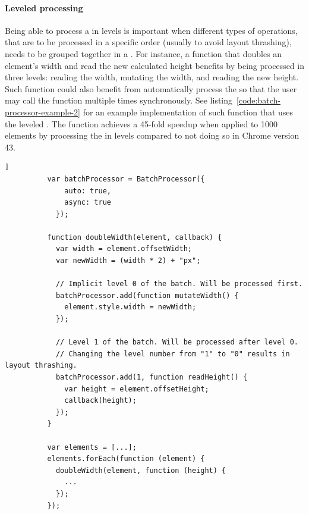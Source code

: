 \documentclass[a4paper,11pt]{kth-mag}
\begin{document}
        \paragraph{Leveled processing}
        Being able to process a  in levels is important when different types of operations, that are to be processed in a specific order (usually to avoid \gls{layout thrashing}), needs to be grouped together in a .
        For instance, a function that doubles an \gls{element}'s width and read the new calculated height benefits by being  processed in three levels: reading the width, mutating the width, and reading the new height.
        Such function could also benefit from automatically process the  so that the user may call the function multiple times synchronously.
        See listing~\ref{code:batch-processor-example-2} for an example implementation of such function that uses the leveled .
        The function achieves a 45-fold speedup when applied to 1000 \glspl{element} by processing the  in levels compared to not doing so in Chrome version 43.
        \begin{lstlisting}[gobble=10,label={code:batch-processor-example-2},caption={Example function that doubles an \gls{element}'s width and returns the new height with a callback. The function uses the leveled \glslink{batch processing}{batch processor} to avoid \gls{layout thrashing} and thus gains a 45-fold speedup.},captionpos=b]]
          var batchProcessor = BatchProcessor({
              auto: true,
              async: true
            });

          function doubleWidth(element, callback) {
            var width = element.offsetWidth;
            var newWidth = (width * 2) + "px";

            // Implicit level 0 of the batch. Will be processed first.
            batchProcessor.add(function mutateWidth() {
              element.style.width = newWidth;
            });

            // Level 1 of the batch. Will be processed after level 0.
            // Changing the level number from "1" to "0" results in layout thrashing.
            batchProcessor.add(1, function readHeight() {
              var height = element.offsetHeight;
              callback(height);
            });
          }

          var elements = [...];
          elements.forEach(function (element) {
            doubleWidth(element, function (height) {
              ...
            });
          });
        \end{lstlisting}
\end{document}
